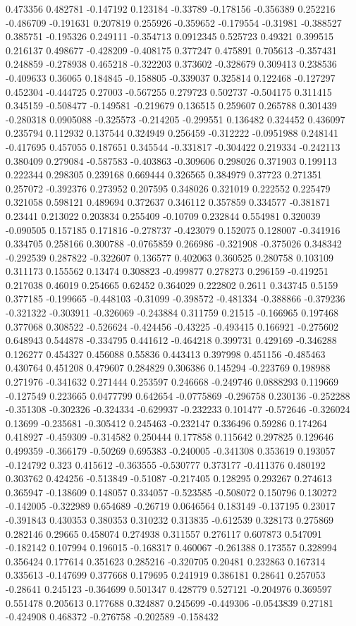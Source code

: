 0.473356 0.482781 -0.147192 0.123184 -0.33789 -0.178156 -0.356389 0.252216 -0.486709 -0.191631 0.207819 0.255926 -0.359652 -0.179554 -0.31981 -0.388527 0.385751 -0.195326 0.249111 -0.354713 0.0912345 0.525723 0.49321 0.399515 0.216137 0.498677 -0.428209 -0.408175 0.377247 0.475891 0.705613 -0.357431 0.248859 -0.278938 0.465218 -0.322203 0.373602 -0.328679 0.309413 0.238536 -0.409633 0.36065 0.184845 -0.158805 -0.339037 0.325814 0.122468 -0.127297 0.452304 -0.444725 0.27003 -0.567255 0.279723 0.502737 -0.504175 0.311415 0.345159 -0.508477 -0.149581 -0.219679 0.136515 0.259607 0.265788 0.301439 -0.280318 0.0905088 -0.325573 -0.214205 -0.299551 0.136482 0.324452 0.436097 0.235794 0.112932 0.137544 0.324949 0.256459 -0.312222 -0.0951988 0.248141 -0.417695 0.457055 0.187651 0.345544 -0.331817 -0.304422 0.219334 -0.242113 0.380409 0.279084 -0.587583 -0.403863 -0.309606 0.298026 0.371903 0.199113 0.222344 0.298305 0.239168 0.669444 0.326565 0.384979 0.37723 0.271351 0.257072 -0.392376 0.273952 0.207595 0.348026 0.321019 0.222552 0.225479 0.321058 0.598121 0.489694 0.372637 0.346112 0.357859 0.334577 -0.381871 0.23441 0.213022 0.203834 0.255409 -0.10709 0.232844 0.554981 0.320039 -0.090505 0.157185 0.171816 -0.278737 -0.423079 0.152075 0.128007 -0.341916 0.334705 0.258166 0.300788 -0.0765859 0.266986 -0.321908 -0.375026 0.348342 -0.292539 0.287822 -0.322607 0.136577 0.402063 0.360525 0.280758 0.103109 0.311173 0.155562 0.13474 0.308823 -0.499877 0.278273 0.296159 -0.419251 0.217038 0.46019 0.254665 0.62452 0.364029 0.222802 0.2611 0.343745 0.5159 0.377185 -0.199665 -0.448103 -0.31099 -0.398572 -0.481334 -0.388866 -0.379236 -0.321322 -0.303911 -0.326069 -0.243884 0.311759 0.21515 -0.166965 0.197468 0.377068 0.308522 -0.526624 -0.424456 -0.43225 -0.493415 0.166921 -0.275602 0.648943 0.544878 -0.334795 0.441612 -0.464218 0.399731 0.429169 -0.346288 0.126277 0.454327 0.456088 0.55836 0.443413 0.397998 0.451156 -0.485463 0.430764 0.451208 0.479607 0.284829 0.306386 0.145294 -0.223769 0.198988 0.271976 -0.341632 0.271444 0.253597 0.246668 -0.249746 0.0888293 0.119669 -0.127549 0.223665 0.0477799 0.642654 -0.0775869 -0.296758 0.230136 -0.252288 -0.351308 -0.302326 -0.324334 -0.629937 -0.232233 0.101477 -0.572646 -0.326024 0.13699 -0.235681 -0.305412 0.245463 -0.232147 0.336496 0.59286 0.174264 0.418927 -0.459309 -0.314582 0.250444 0.177858 0.115642 0.297825 0.129646 0.499359 -0.366179 -0.50269 0.695383 -0.240005 -0.341308 0.353619 0.193057 -0.124792 0.323 0.415612 -0.363555 -0.530777 0.373177 -0.411376 0.480192 0.303762 0.424256 -0.513849 -0.51087 -0.217405 0.128295 0.293267 0.274613 0.365947 -0.138609 0.148057 0.334057 -0.523585 -0.508072 0.150796 0.130272 -0.142005 -0.322989 0.654689 -0.26719 0.0646564 0.183149 -0.137195 0.23017 -0.391843 0.430353 0.380353 0.310232 0.313835 -0.612539 0.328173 0.275869 0.282146 0.29665 0.458074 0.274938 0.311557 0.276117 0.607873 0.547091 -0.182142 0.107994 0.196015 -0.168317 0.460067 -0.261388 0.173557 0.328994 0.356424 0.177614 0.351623 0.285216 -0.320705 0.20481 0.232863 0.167314 0.335613 -0.147699 0.377668 0.179695 0.241919 0.386181 0.28641 0.257053 -0.28641 0.245123 -0.364699 0.501347 0.428779 0.527121 -0.204976 0.369597 0.551478 0.205613 0.177688 0.324887 0.245699 -0.449306 -0.0543839 0.27181 -0.424908 0.468372 -0.276758 -0.202589 -0.158432 